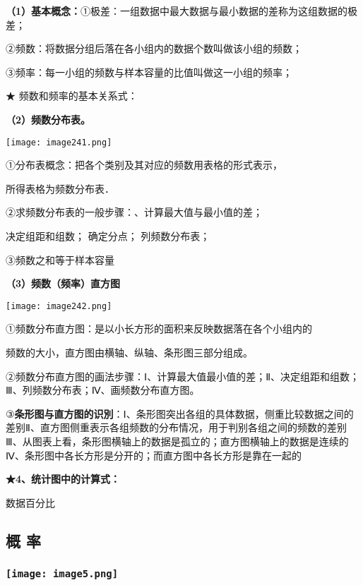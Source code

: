 \textbf{（1）基本概念：}①极差：一组数据中最大数据与最小数据的差称为这组数据的极差；

②频数：将数据分组后落在各小组内的数据个数叫做该小组的频数；

③频率：每一小组的频数与样本容量的比值叫做这一小组的频率；

★ 频数和频率的基本关系式：

\textbf{（2）频数分布表。}

\texttt{[image: image241.png]}

①分布表概念：把各个类别及其对应的频数用表格的形式表示，

所得表格为频数分布表．

②求频数分布表的一般步骤：、计算最大值与最小值的差；

决定组距和组数； 确定分点； 列频数分布表；

③频数之和等于样本容量

\textbf{（3）频数（频率）直方图}

\texttt{[image: image242.png]}

①频数分布直方图：是以小长方形的面积来反映数据落在各个小组内的

频数的大小，直方图由横轴、纵轴、条形图三部分组成。

②频数分布直方图的画法步骤：Ⅰ、计算最大值最小值的差；Ⅱ、决定组距和组数；Ⅲ、列频数分布表；Ⅳ、画频数分布直方图。

③\textbf{条形图与直方图的识別}：Ⅰ、条形图突出各组的具体数据，侧重比较数据之间的差别Ⅱ、直方图侧重表示各组频数的分布情况，用于判别各组之间的频数的差别Ⅲ、从图表上看，条形图横轴上的数据是孤立的；直方图横轴上的数据是连续的
Ⅳ、条形图中各长方形是分开的；而直方图中各长方形是靠在一起的

\textbf{★4、统计图中的计算式：}

数据百分比

\hypertarget{ux6982-ux7387}{%
\subsection{\texorpdfstring{ 概 率}{ 概 率}}\label{ux6982-ux7387}}

\hypertarget{ux5b66ux79d1ux7f51www.zxxk.com--ux6559ux80b2ux8d44ux6e90ux95e8ux6237ux63d0ux4f9bux8bd5ux9898ux8bd5ux5377ux6559ux6848ux8bfeux4ef6ux6559ux5b66ux8bbaux6587ux7d20ux6750ux7b49ux5404ux7c7bux6559ux5b66ux8d44ux6e90ux5e93ux4e0bux8f7dux8fd8ux6709ux5927ux91cfux4e30ux5bccux7684ux6559ux5b66ux8d44ux8baf-44}{%
\subsubsection{\texorpdfstring{\protect\texttt{[image: image5.png]}}{学科网(www.zxxk.com)-\/-教育资源门户，提供试题试卷、教案、课件、教学论文、素材等各类教学资源库下载，还有大量丰富的教学资讯！}}\label{ux5b66ux79d1ux7f51www.zxxk.com--ux6559ux80b2ux8d44ux6e90ux95e8ux6237ux63d0ux4f9bux8bd5ux9898ux8bd5ux5377ux6559ux6848ux8bfeux4ef6ux6559ux5b66ux8bbaux6587ux7d20ux6750ux7b49ux5404ux7c7bux6559ux5b66ux8d44ux6e90ux5e93ux4e0bux8f7dux8fd8ux6709ux5927ux91cfux4e30ux5bccux7684ux6559ux5b66ux8d44ux8baf-44}}

